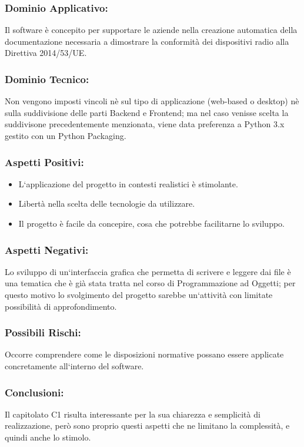 \documentclass[a4paper,12pt]{article}
\begin{document}
\subsubsection*{Dominio Applicativo:} Il software è concepito per supportare le aziende nella creazione automatica della documentazione necessaria a dimostrare la conformità dei dispositivi radio alla Direttiva 2014/53/UE.
\subsubsection*{Dominio Tecnico:} Non vengono imposti vincoli nè sul tipo di applicazione (web-based o desktop) nè sulla suddivisione delle parti Backend e Frontend; ma nel caso venisse scelta la suddivisone precedentemente menzionata, viene data preferenza a Python 3.x gestito con un Python Packaging.
\subsubsection*{Aspetti Positivi:}
\begin{itemize}
    \item L`applicazione del progetto in contesti realistici è stimolante.
    \item Libertà nella scelta delle tecnologie da utilizzare.
    \item Il progetto è facile da concepire, cosa che potrebbe facilitarne lo sviluppo.
\end{itemize}

\subsubsection*{Aspetti Negativi:}
Lo sviluppo di un`interfaccia grafica che permetta di scrivere e leggere dai file è una tematica che è già stata tratta nel corso di Programmazione ad Oggetti; per questo motivo lo svolgimento del progetto sarebbe un`attività con limitate possibilità di approfondimento.

\subsubsection*{Possibili Rischi:}
Occorre comprendere come le disposizioni normative possano essere applicate concretamente all`interno del software.

\subsubsection*{Conclusioni:}
Il capitolato C1 risulta interessante per la sua chiarezza e semplicità di realizzazione, però sono proprio questi aspetti che ne limitano la complessità, e quindi anche lo stimolo.
\end{document}
